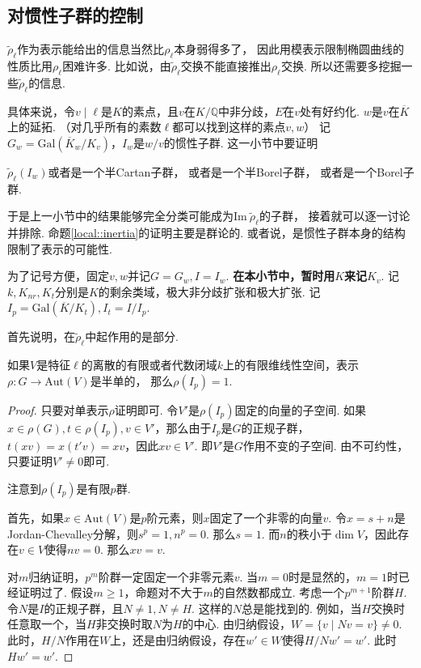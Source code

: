 \subsection{对惯性子群的控制}

$\tilde{\rho}_{\ell}$作为表示能给出的信息当然比$\rho_{\ell}$本身弱得多了，
因此用模表示限制椭圆曲线的性质比用$\rho_{\ell}$困难许多.
比如说，由$\tilde{\rho}_{\ell}$交换不能直接推出$\rho_{\ell}$交换.
所以还需要多挖掘一些$\tilde{\rho}_{\ell}$的信息.

具体来说，令$v\mid \ell$是$K$的素点，且$v$在$K/\mathbb{Q}$中非分歧，$E$在$v$处有好约化.
$w$是$v$在$\overline{K}$上的延拓.
（对几乎所有的素数$\ell$都可以找到这样的素点$v, w$）
记$G_w=\mathrm{Gal}(\overline{K}_w/K_v)$，$I_w$是$w/v$的惯性子群.
这一小节中要证明
\begin{cprop}
    $\tilde{\rho}_{\ell}(I_w)$或者是一个半Cartan子群，
    或者是一个半Borel子群，
    或者是一个Borel子群. \label{local::inertia}
\end{cprop}

于是上一小节中的结果能够完全分类可能成为$\mathrm{Im}\ \tilde{\rho}_{\ell}$的子群，
接着就可以逐一讨论并排除.
命题\ref{local::inertia}的证明主要是群论的. 或者说，是惯性子群本身的结构限制了表示的可能性.

为了记号方便，固定$v,w$并记$G = G_w, I = I_w$.
{\bfseries 在本小节中，暂时用$K$来记$K_v$}. 记$k,K_{nr},K_{t}$分别是$K$的剩余类域，极大非分歧扩张和极大\tame 扩张.
记$I_p = \mathrm{Gal}(\overline{K}/K_t), I_t = I/I_p$.

首先说明，在$\tilde{\rho}_{\ell}$中起作用的是\tame 部分.

\begin{cprop}
    如果$V$是特征$\ell$的离散的有限或者代数闭域$k$上的有限维线性空间，表示$\rho: G\to \mathrm{Aut}(V)$是半单的，
    那么$\rho(I_p) = 1$.
\end{cprop}

\begin{proof}
    只要对单表示$\rho$证明即可. 令$V'$是$\rho(I_p)$固定的向量的子空间.
    如果$x\in \rho(G),t\in \rho(I_p), v\in V'$，那么由于$I_p$是$G$的正规子群，
    $t(xv) = x(t'v)=xv$，因此$xv\in V'$. 即$V'$是$G$作用不变的子空间.
    由不可约性，只要证明$V'\neq 0$即可.
    
    注意到$\rho(I_p)$是有限$p$群.

    首先，如果$x\in\mathrm{Aut}(V)$是$p$阶元素，则$x$固定了一个非零的向量$v$.
    令$x=s+n$是Jordan-Chevalley分解，则$s^p = 1, n^p = 0$. 那么$s = 1$.
    而$n$的秩小于$\dim V$，因此存在$v\in V$使得$nv=0$. 那么$xv = v$.

    对$m$归纳证明，$p^m$阶群一定固定一个非零元素$v$. 当$m=0$时是显然的，$m=1$时已经证明过了.
    假设$m\geq 1$，命题对不大于$m$的自然数都成立. 考虑一个$p^{m+1}$阶群$H$.
    令$N$是$I$的正规子群，且$N\neq 1,N\neq H$. 这样的$N$总是能找到的.
    例如，当$H$交换时任意取一个，当$H$非交换时取$N$为$H$的中心.
    由归纳假设，$W = \{v\mid Nv=v\}\neq 0$.
    此时，$H/N$作用在$W$上，还是由归纳假设，存在$w'\in W$使得$H/N w' = w'$.
    此时$Hw' = w'$.
\end{proof}


